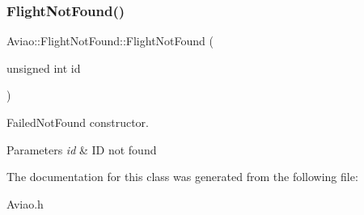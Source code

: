 \subsubsection{\texorpdfstring{Flight\+Not\+Found()}{FlightNotFound()}}
{\footnotesize\ttfamily Aviao\+::\+Flight\+Not\+Found\+::\+Flight\+Not\+Found (\begin{DoxyParamCaption}\item[{unsigned int}]{id }\end{DoxyParamCaption})\hspace{0.3cm}{\ttfamily [inline]}}



Failed\+Not\+Found constructor. 


\begin{DoxyParams}{Parameters}
{\em id} & ID not found \\
\hline
\end{DoxyParams}


The documentation for this class was generated from the following file\+:\begin{DoxyCompactItemize}
\item 
Aviao.\+h\end{DoxyCompactItemize}
